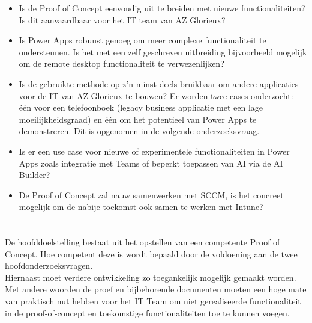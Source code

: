 \begin{itemize}[label={$\circ$}]
    \item Is de Proof of Concept eenvoudig uit te breiden met nieuwe functionaliteiten? Is dit aanvaardbaar voor het IT team van AZ Glorieux?
    \item Is Power Apps robuust genoeg om meer complexe functionaliteit te ondersteunen. Is het met een zelf geschreven uitbreiding bijvoorbeeld mogelijk om de remote desktop functionaliteit te verwezenlijken?
    \item Is de gebruikte methode op z'n minst deels bruikbaar om andere applicaties voor de IT van AZ Glorieux te bouwen? Er worden twee cases onderzocht: één voor een telefoonboek (legacy business applicatie met een lage moeilijkheidsgraad) en één om het potentieel van Power Apps te demonstreren. Dit is opgenomen in de volgende onderzoeksvraag.
    \item Is er een use case voor nieuwe of experimentele functionaliteiten in Power Apps zoals integratie met Teams of beperkt toepassen van AI via de AI Builder?
    \item De Proof of Concept zal nauw samenwerken met SCCM, is het concreet mogelijk om de nabije toekomst ook samen te werken met Intune?
\end{itemize}

\section{}
\label{sec:onderzoeksdoelstelling}

De hoofddoelstelling bestaat uit het opstellen van een competente Proof of Concept. Hoe competent deze is wordt bepaald door de voldoening aan de twee hoofdonderzoeksvragen.\\
Hiernaast moet verdere ontwikkeling zo toegankelijk mogelijk gemaakt worden. Met andere woorden de proef en bijbehorende documenten moeten een hoge mate van praktisch nut hebben voor het IT Team om niet gerealiseerde functionaliteit in de proof-of-concept en toekomstige functionaliteiten toe te kunnen voegen.


\section{}
\label{sec:opzet-bachelorproef}


